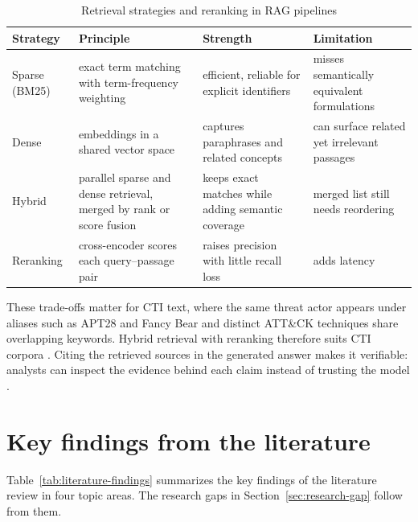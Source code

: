 \begin{table}[H]
    \centering
    \small
    \begin{tabular}{lp{}p{}p{}}
        \toprule
        \textbf{Strategy} & \textbf{Principle} & \textbf{Strength} & \textbf{Limitation} \\
        \midrule
        Sparse (BM25) & exact term matching with term-frequency weighting
            & efficient, reliable for explicit identifiers
            & misses semantically equivalent formulations \\
        Dense & embeddings in a shared vector space
            & captures paraphrases and related concepts
            & can surface related yet irrelevant passages \\
        Hybrid & parallel sparse and dense retrieval, merged by rank or
                 score fusion
            & keeps exact matches while adding semantic coverage
            & merged list still needs reordering \\
        Reranking & cross-encoder scores each query--passage pair
            & raises precision with little recall loss
            & adds latency \\
        \bottomrule
    \end{tabular}
    \caption{Retrieval strategies and reranking in RAG pipelines}
    \label{tab:retrieval-strategies}
\end{table}

These trade-offs matter for CTI text, where the same threat actor appears
under aliases such as APT28 and Fancy Bear and distinct ATT\&CK techniques
share overlapping keywords. Hybrid retrieval with reranking therefore
suits CTI corpora \parencite{alhuzali2025llm,lekssays2025techniquerag}.
Citing the retrieved sources in the generated answer makes it verifiable:
analysts can inspect the evidence behind each claim instead of trusting
the model \parencite{rajapaksha2024rag,liu2023trustworthy}.

\clearpage %
\section{Key findings from the literature}
\label{sec:literature-findings}

Table~\ref{tab:literature-findings} summarizes the key findings of the
literature review in four topic areas. The research gaps in
Section~\ref{sec:research-gap} follow from them.


